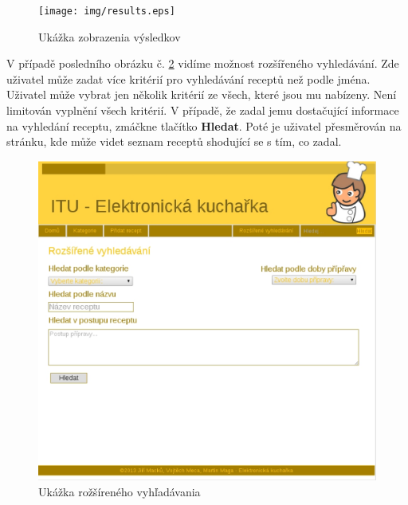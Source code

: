 \documentclass[12pt,a4paper,titlepage,final]{article}
\begin{document}
\begin{figure}

\begin{center}

\texttt{[image: img/results.eps]} 
\caption{Ukážka zobrazenia výsledkov}
\label{vysledky}

\end{center}

\end{figure}

V případě posledního obrázku č. \ref{rozVyhledavani} vidíme možnost rozšířeného vyhledávání. Zde uživatel může zadat více kritérií pro vyhledávání receptů než podle jména. Uživatel může vybrat jen několik kritérií ze všech, které jsou mu nabízeny. Není limitován vyplnění všech kritérií. V případě, že zadal jemu dostačující informace na vyhledání receptu, zmáčkne tlačítko \textbf{Hledat}. Poté je uživatel přesměrován na stránku, kde může videt seznam receptů shodující se s tím, co zadal.  

\begin{figure}
\begin{center}

\includegraphics[scale=0.7]{img/extendedsearch.eps} 
\caption{Ukážka rožšíreného vyhľadávania}
\label{rozVyhledavani}

\end{center}

\end{figure}
\end{document}
